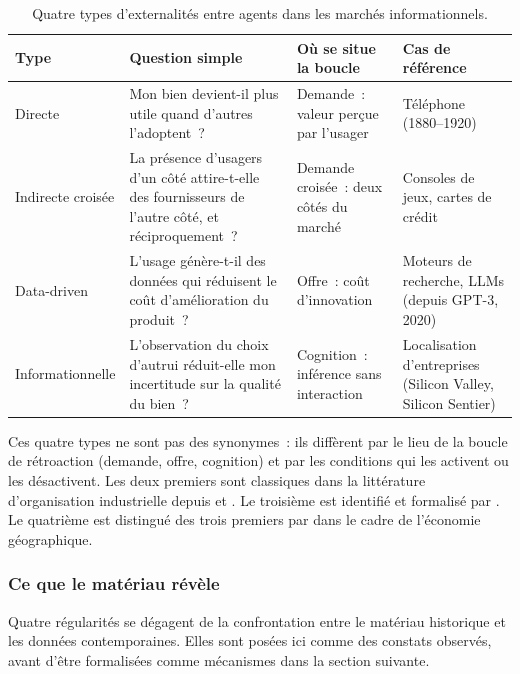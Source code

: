 \begin{table}[!ht]
\caption{Quatre types d'externalités entre agents dans les marchés informationnels.}\label{tab:d2-externalites}
\centering\footnotesize
\renewcommand{\arraystretch}{1.25}
\begin{tabularx}{\textwidth}{@{}p{2.2cm}Xp{2.8cm}p{2.8cm}@{}}
\toprule
\textbf{Type} & \textbf{Question simple} & \textbf{Où se situe la boucle} & \textbf{Cas de référence} \\
\midrule
Directe & Mon bien devient-il plus utile quand d'autres l'adoptent~? & Demande~: valeur perçue par l'usager & Téléphone (1880--1920) \\[4pt]
Indirecte croisée & La présence d'usagers d'un côté attire-t-elle des fournisseurs de l'autre côté, et réciproquement~? & Demande croisée~: deux côtés du marché & Consoles de jeux, cartes de crédit \\[4pt]
Data-driven & L'usage génère-t-il des données qui réduisent le coût d'amélioration du produit~? & Offre~: coût d'innovation & Moteurs de recherche, LLMs (depuis GPT-3, 2020) \\[4pt]
Informationnelle & L'observation du choix d'autrui réduit-elle mon incertitude sur la qualité du bien~? & Cognition~: inférence sans interaction & Localisation d'entreprises (Silicon Valley, Silicon Sentier) \\
\bottomrule
\end{tabularx}
\renewcommand{\arraystretch}{1.0}
\end{table}

Ces quatre types ne sont pas des synonymes~: ils diffèrent par le lieu de la boucle de rétroaction (demande, offre, cognition) et par les conditions qui les activent ou les désactivent. Les deux premiers sont classiques dans la littérature d'organisation industrielle depuis \textcite{katz_network_1985} et \textcite{rochet_platform_2003}. Le troisième est identifié et formalisé par \textcite{pruefer_competing_2021}. Le quatrième est distingué des trois premiers par \textcite{vicente_externalites_2002} dans le cadre de l'économie géographique.


\subsubsection{Ce que le matériau révèle}

Quatre régularités se dégagent de la confrontation entre le matériau historique et les données contemporaines. Elles sont posées ici comme des constats observés, avant d'être formalisées comme mécanismes dans la section suivante.

